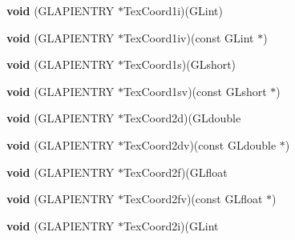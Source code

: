 \begin{DoxyCompactItemize}
\item 
\mbox{\label{struct_____g_ldispatch_table_rec_ac54391e9f27118a8375524d092f2880b}} 
{\bfseries void} (G\+L\+A\+P\+I\+E\+N\+T\+RY $\ast$Tex\+Coord1i)(G\+Lint)
\item 
\mbox{\label{struct_____g_ldispatch_table_rec_a46351b4f1df1817f88f41d822d0d09fd}} 
{\bfseries void} (G\+L\+A\+P\+I\+E\+N\+T\+RY $\ast$Tex\+Coord1iv)(const G\+Lint $\ast$)
\item 
\mbox{\label{struct_____g_ldispatch_table_rec_a87aa2836a67364ff7dcdc3ab8273341e}} 
{\bfseries void} (G\+L\+A\+P\+I\+E\+N\+T\+RY $\ast$Tex\+Coord1s)(G\+Lshort)
\item 
\mbox{\label{struct_____g_ldispatch_table_rec_a4540ed382c617402dbf42cdce32837e6}} 
{\bfseries void} (G\+L\+A\+P\+I\+E\+N\+T\+RY $\ast$Tex\+Coord1sv)(const G\+Lshort $\ast$)
\item 
\mbox{\label{struct_____g_ldispatch_table_rec_a041a7b868801d787a97a4342d5e5b837}} 
{\bfseries void} (G\+L\+A\+P\+I\+E\+N\+T\+RY $\ast$Tex\+Coord2d)(G\+Ldouble
\item 
\mbox{\label{struct_____g_ldispatch_table_rec_abab300838f118b31e15d58a5ac7479a4}} 
{\bfseries void} (G\+L\+A\+P\+I\+E\+N\+T\+RY $\ast$Tex\+Coord2dv)(const G\+Ldouble $\ast$)
\item 
\mbox{\label{struct_____g_ldispatch_table_rec_a599482ea1f4b4da95389a181205bcb76}} 
{\bfseries void} (G\+L\+A\+P\+I\+E\+N\+T\+RY $\ast$Tex\+Coord2f)(G\+Lfloat
\item 
\mbox{\label{struct_____g_ldispatch_table_rec_a46e7cf145b3037673bd4fd4c5a22b707}} 
{\bfseries void} (G\+L\+A\+P\+I\+E\+N\+T\+RY $\ast$Tex\+Coord2fv)(const G\+Lfloat $\ast$)
\item 
\mbox{\label{struct_____g_ldispatch_table_rec_a68c651ae8445d51ba275217de6616b17}} 
{\bfseries void} (G\+L\+A\+P\+I\+E\+N\+T\+RY $\ast$Tex\+Coord2i)(G\+Lint

\end{DoxyCompactItemize}
